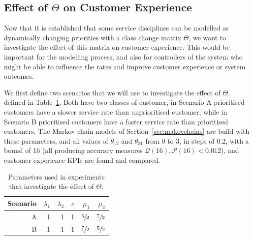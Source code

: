 \documentclass{article}
\begin{document}
\subsection{Effect of $\Theta$ on Customer Experience}\label{sec:behaviour}
Now that it is established that some service disciplines can be modelled as
dynamically changing priorities with a class change matrix $\Theta$, we want to
investigate the effect of this matrix on customer experience. This would be
important for the modelling process, and also for controllers of the system who
might be able to influence the rates and improve customer experience or system
outcomes.

We first define two scenarios that we will use to investigate the effect of
$\Theta$, defined in Table~\ref{tbl:scenarios}. Both have two classes of
customer, in Scenario A prioritised customers have a slower service rate than
unprioritised customer, while in Scenario B prioritised customers have a faster
service rate than prioritised customers. The Markov chain models of
Section~\ref{sec:makovchains} are build with these parameters, and all values
of $\theta_{12}$ and $\theta_{21}$ from 0 to 3, in steps of 0.2, with a bound of
16 (all producing accuracy measures $\mathcal{Q}(16), \mathcal{P}(16) < 0.012$),
and customer experience KPIs are found and compared.

\begin{table}
\begin{center}
\begin{tabular}{rrrrrr}
\toprule
Scenario & $\lambda_1$ & $\lambda_2$ & $c$ & $\mu_1$ & $\mu_2$ \\
\midrule
A & 1 & 1 & 1& $\sfrac{5}{2}$ & $\sfrac{7}{2}$\\ 
B & 1 & 1 & 1& $\sfrac{7}{2}$ & $\sfrac{5}{2}$\\
\bottomrule
\end{tabular}
\end{center}
\caption{Parameters used in experiments that investigate the effect of $\Theta$.}
\label{tbl:scenarios}
\end{table}
\end{document}

